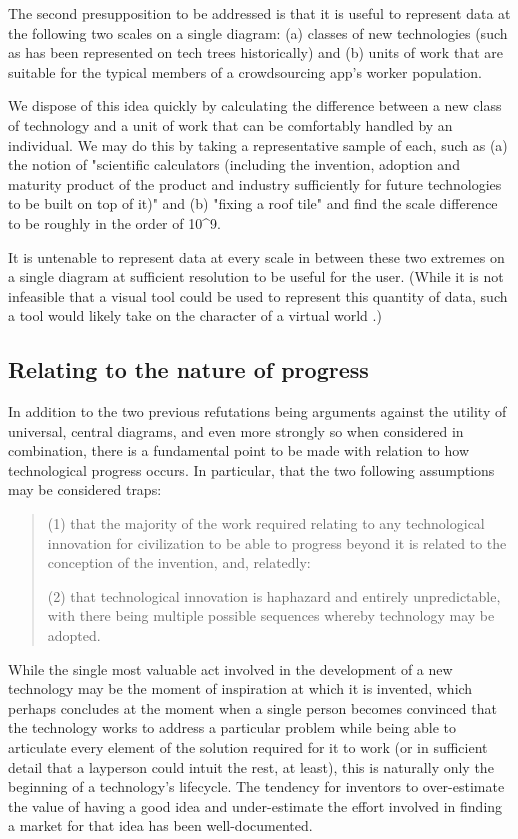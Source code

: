 \documentclass{article}
\begin{document}
\begin{multicols}{2}
The second presupposition to be addressed is that it is useful to represent data at the following two scales on a single diagram: (a) classes of new technologies (such as has been represented on tech trees historically) and (b) units of work that are suitable for the typical members of a crowdsourcing app's worker population.

We dispose of this idea quickly by calculating the difference between a new class of technology and a unit of work that can be comfortably handled by an individual. We may do this by taking a representative sample of each, such as (a) the notion of "scientific calculators (including the invention, adoption and maturity product of the product and industry sufficiently for future technologies to be built on top of it)" and (b) "fixing a roof tile" and find the scale difference to be roughly in the order of 10^9. \phantom{(XX)}

It is untenable to represent data at every scale in between these two extremes on a single diagram at sufficient resolution to be useful for the user. (While it is not infeasible that a visual tool could be used to represent this quantity of data, such a tool would likely take on the character of a virtual world \phantom{[3]}.)

\subsection{Relating to the nature of progress}

In addition to the two previous refutations being arguments against the utility of universal, central diagrams, and even more strongly so when considered in combination, there is a fundamental point to be made with relation to how technological progress occurs. In particular, that the two following assumptions may be considered traps:

\begin{quote}

(1) that the majority of the work required relating to any technological innovation for civilization to be able to progress beyond it is related to the conception of the invention, and, relatedly:

(2) that technological innovation is haphazard and entirely unpredictable, with there being multiple possible sequences whereby technology may be adopted.
    
\end{quote}


While the single most valuable act involved in the development of a new technology may be the moment of inspiration at which it is invented, which perhaps concludes at the moment when a single person becomes convinced that the technology works to address a particular problem while being able to articulate every element of the solution required for it to work (or in sufficient detail that a layperson could intuit the rest, at least), this is naturally only the beginning of a technology's lifecycle.  The tendency for inventors to over-estimate the value of having a good idea and under-estimate the effort involved in finding a market for that idea has been well-documented.


\end{multicols}
\end{document}
